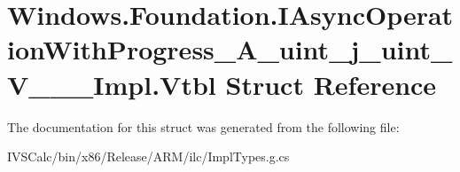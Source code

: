 \hypertarget{struct_windows_1_1_foundation_1_1_i_async_operation_with_progress___a__uint__j__uint___v_______impl_1_1_vtbl}{}\section{Windows.\+Foundation.\+I\+Async\+Operation\+With\+Progress\+\_\+\+A\+\_\+uint\+\_\+j\+\_\+uint\+\_\+\+V\+\_\+\+\_\+\+\_\+\+Impl.\+Vtbl Struct Reference}
\label{struct_windows_1_1_foundation_1_1_i_async_operation_with_progress___a__uint__j__uint___v_______impl_1_1_vtbl}


The documentation for this struct was generated from the following file\+:\begin{DoxyCompactItemize}
\item 
I\+V\+S\+Calc/bin/x86/\+Release/\+A\+R\+M/ilc/Impl\+Types.\+g.\+cs\end{DoxyCompactItemize}

